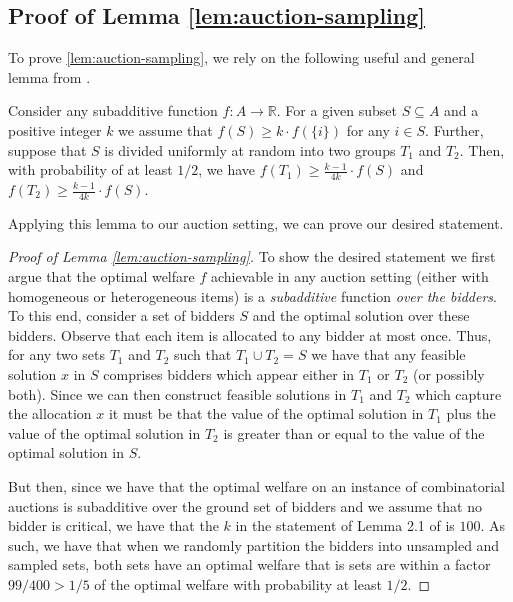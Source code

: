 \subsection{Proof of Lemma \ref{lem:auction-sampling}}\label{subsec::proof-auction-sampling}

To prove \cref{lem:auction-sampling}, we rely on the following useful and general lemma from \cite{bei2017worst}.  
\begin{lemma}
Consider any subadditive function $f : A \rightarrow \mathbb{R}$.  For a given subset $S \subseteq A$ and a positive integer $k$ we assume that $f(S) \geq k \cdot f(\{i\})$ for any $i \in S$.  Further, suppose that $S$ is divided uniformly at random into two groups $T_1$ and $T_2$.  Then, with probability of at least $1/2$, we have $f(T_1) \geq \frac{k-1}{4k} \cdot  f(S)$ and $f(T_2) \geq \frac{k-1}{4k} \cdot f(S)$.
\end{lemma}

Applying this lemma to our auction setting, we can prove our desired statement.

\begin{proof}[Proof of Lemma \ref{lem:auction-sampling}]
To show the desired statement we first argue that the optimal welfare $f$ achievable in any  auction setting (either with homogeneous or heterogeneous items) is a \emph{subadditive} function \emph{over the bidders}. To this end,  consider a set of bidders $S$ and the optimal solution over these bidders.  Observe that each item is allocated to any bidder at most once.  Thus, for any two sets $T_1$ and $T_2$ such that $T_1 \cup T_2 = S$ we have that any feasible solution $x$ in $S$ comprises bidders which appear either in $T_1$ or $T_2$ (or possibly both).  Since we can then construct feasible solutions in $T_1$ and $T_2$ which capture the allocation $x$ it must be that the value of the optimal solution in $T_1$ plus the value of the optimal solution in $T_2$ is greater than or equal to the value of the optimal solution in $S$.

But then, since we have that the optimal welfare on an instance of combinatorial auctions is subadditive over the ground set of bidders and we assume that no bidder is critical, we have that the $k$ in the statement of Lemma 2.1 of \cite{bei2017worst} is $100$.  As such, we have that when we randomly partition the bidders into unsampled and sampled sets, both sets have an optimal welfare that is sets are within a factor $99/400 > 1/5$ of the optimal welfare with probability at least $1/2$.
\end{proof}


